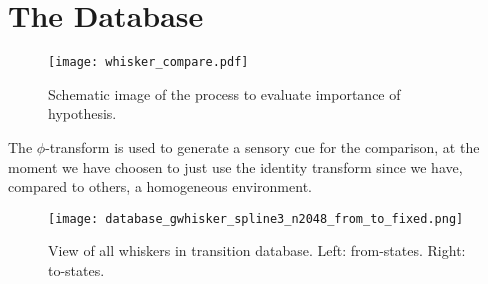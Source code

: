 \section*{The Database}



\begin{figure}
  \centering
  \texttt{[image: whisker\_compare.pdf]}
  \caption{Schematic image of the process to evaluate importance of hypothesis.}
  \label{fig:whisker_compare}
\end{figure}

The $\phi$-transform is used to generate a sensory cue for the comparison, at the moment we have choosen to just use the identity transform since we have, compared to others, a homogeneous environment.

\begin{figure}
  \centering
  \texttt{[image: database\_gwhisker\_spline3\_n2048\_from\_to\_fixed.png]}
  \caption{View of all whiskers in transition database. Left: from-states. Right: to-states.}
  \label{fig:database}
\end{figure}

